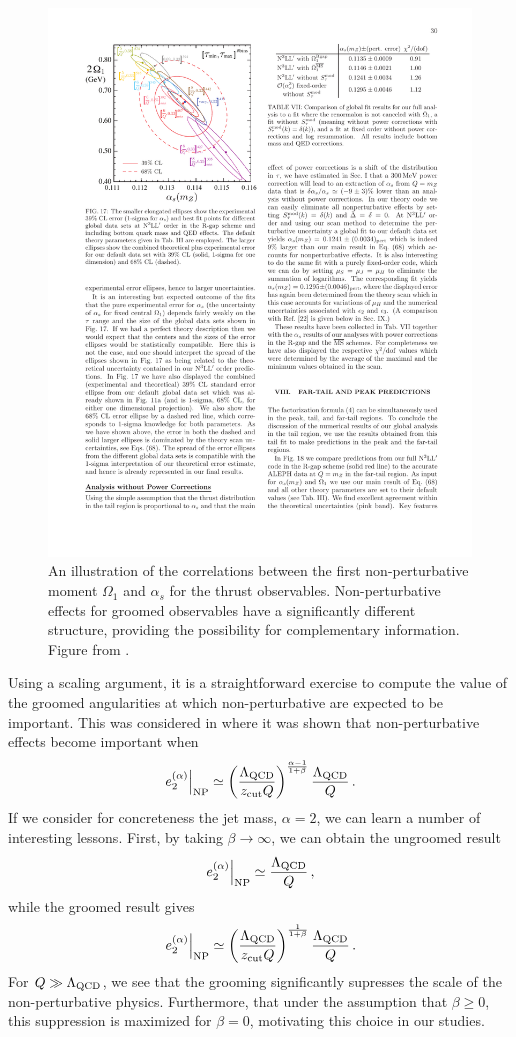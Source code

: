 \begin{figure}
\begin{center}
\includegraphics[width = 0.6\columnwidth]{figures/correlation_firstmoment.pdf}
\end{center}
\caption{An illustration of the correlations between the first non-perturbative moment $\Omega_1$ and $\alpha_s$ for the thrust observables. Non-perturbative effects for groomed observables have a significantly different structure, providing the possibility for complementary information. Figure from \cite{Abbate:2010xh}.}
\label{fig:correlation_firstmoment}
\end{figure}


Using a scaling argument, it is a straightforward exercise to compute the value of the groomed angularities at which non-perturbative are expected to be important. This was considered in  \cite{Frye:2016aiz}
where it was shown that non-perturbative effects become important when
\begin{align}
\left. e_{2}^{(\alpha)} \right |_{\text{NP}} \simeq  \left( \frac{{\Lambda_\text{QCD}}}{z_{\rm cut} Q}  \right)^{\frac{\alpha-1}{1+\beta}}  \frac{{\Lambda_\text{QCD}}}{Q}\,.
\end{align}
If we consider for concreteness the jet mass, $\alpha=2$, we can learn a number of interesting lessons. First, by taking $\beta\to \infty$, we can obtain the ungroomed result
\begin{align}
\left. e_{2}^{(\alpha)} \right |_{\text{NP}} \simeq  \frac{{\Lambda_\text{QCD}}}{Q}\,,
\end{align} 
while the groomed result gives 
\begin{align}
\left. e_{2}^{(\alpha)} \right |_{\text{NP}} \simeq  \left( \frac{{\Lambda_\text{QCD}}}{z_{\rm cut} Q}  \right)^{\frac{1}{1+\beta}}  \frac{{\Lambda_\text{QCD}}}{Q}\,.
\end{align}
For $Q\gg {\Lambda_\text{QCD}}$, we see that the grooming significantly supresses the scale of the non-perturbative physics. Furthermore, that under the assumption that $\beta \geq 0$, this suppression is maximized for $\beta=0$, motivating this choice in our studies. 

